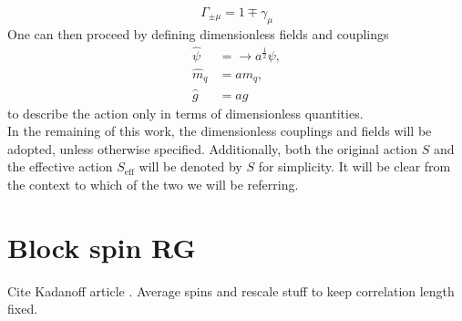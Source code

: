 \begin{equation*}
    \Gamma_{\pm \mu} = 1 \mp \gamma_\mu 
\end{equation*}
One can then proceed by defining dimensionless fields and couplings
\begin{equation*}
    \begin{aligned}
        \hat\psi &= \rightarrow a^{\frac{1}{2}} \psi, \\
        \hat m_q &= a m_q, \\
        \hat g &= a g
    \end{aligned}
    \label{eq:fermionic_theory_dimless_redefinitions}
\end{equation*}
to describe the action only in terms of dimensionless quantities. \\
In the remaining of this work, the dimensionless couplings and fields will be adopted, unless otherwise specified. Additionally, both the original action $S$ and the effective action $S_\text{eff}$ will be denoted by $S$ for simplicity. It will be clear from the context to which of the two we will be referring. \\


\section{Block spin RG}
\label{sec:blockspin}
Cite Kadanoff article \cite{PhysicsPhysiqueFizika.2.263}. Average spins and rescale stuff to keep correlation length fixed.

